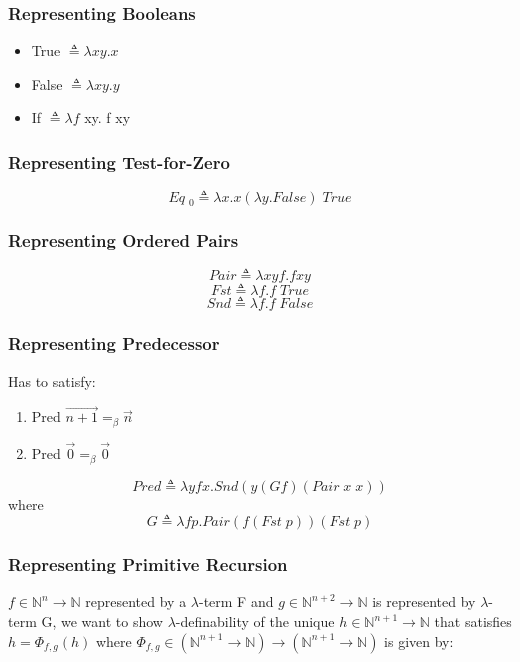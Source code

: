 \documentclass{article}
\begin{document}
\subsubsection{Representing Booleans}
\begin{itemize}
    \item True $\triangleq \lambda xy.x$
    \item False $\triangleq \lambda xy.y$
    \item If $\triangleq \lambda f$ xy. f xy
\end{itemize}

\subsubsection{Representing Test-for-Zero}
\begin{equation}
    Eq \; _{0} \triangleq \lambda x.x(\lambda y.False) \; True
\end{equation}

\subsubsection{Representing Ordered Pairs}
$$Pair \triangleq \lambda x y f.f xy $$
$$Fst \triangleq \lambda f.f \; True$$
$$Snd \triangleq \lambda f.f \; False$$

\subsubsection{Representing Predecessor}
Has to satisfy:
\begin{enumerate}
    \item Pred $\vec{n+1} =_{\beta} \vec{n}$
    \item Pred $\vec{0} =_{\beta} \vec{0}$
\end{enumerate}

\begin{equation}
    Pred \triangleq \lambda y f x . Snd(y (G f)(Pair \; x \; x))
\end{equation}
where
\begin{equation}
    G \triangleq \lambda f p . Pair(f(Fst \; p))(Fst \; p)
\end{equation}

\subsubsection{Representing Primitive Recursion}
$f \in \mathbb{N}^{n} \rightarrow \mathbb{N}$ represented by a $\lambda$-term F and $g \in \mathbb{N}^{n+2} \rightarrow \mathbb{N}$ is represented by $\lambda$-term G, we want to show $\lambda$-definability of the unique $h \in \mathbb{N}^{n+1} \rightarrow \mathbb{N}$ that satisfies $h = \Phi_{f, g}(h)$ where $\Phi_{f, g} \in\left(\mathbb{N}^{n+1} \rightarrow \mathbb{N}\right) \rightarrow\left(\mathbb{N}^{n+1} \rightarrow \mathbb{N}\right)$ is given by:
\end{document}
